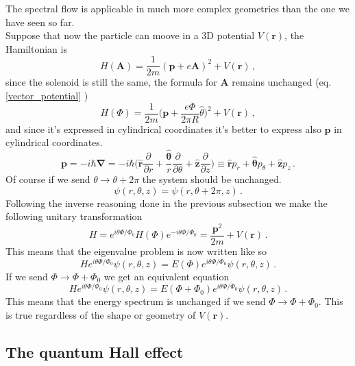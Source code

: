         The spectral flow is applicable in much more complex geometries than the one we have seen so far.\\
        Suppose that now the particle can moove in a 3D potential $V(\mathbf r)$, the Hamiltonian is
        \[
            H(\mathbf A)=\frac 1{2m}(\mathbf p + e\mathbf A)^2 + V(\mathbf r) \,,
        \]
        since the solenoid is still the same, the formula for $\mathbf A$ remains unchanged (eq. \ref{vector_potential} )
        \[
            H(\Phi)=\frac 1{2m}\bigg(\mathbf p + \frac{e\Phi}{2\pi R}\hat \theta\bigg)^2 + V(\mathbf r)\,,
        \]
        and since it's expressed in cylindrical coordinates it's better to express also $\mathbf p$ in cylindrical coordinates.
        \[
         \mathbf p =-i\hbar \mathbf \nabla=-i\hbar\bigg( 
             \mathbf{\hat r}\frac{\partial}{\partial r}+ \frac{\mathbf {\hat \theta}}{r}\frac{\partial}{\partial \theta} + \mathbf{\hat z}\frac{\partial}{\partial z}  \bigg) \equiv
             \mathbf{\hat r} p_r+ \mathbf {\hat \theta} p_\theta + \mathbf{\hat z} p_z\,.
        \]
        Of course if we send $\theta \to \theta + 2\pi$ the system should be unchanged.
        \[
            \psi(r,\theta,z)=\psi(r,\theta+2\pi,z)\,.
        \]
        Following the inverse reasoning done in the previous subsection we make the following unitary transformation
        \[
            H=e^{i\theta\Phi/\Phi_0}H(\Phi)e^{-i\theta\Phi/\Phi_0}=\frac  {\mathbf p^2} {2m} + V(\mathbf r)\,.
        \]
        This means that the eigenvalue problem is now written like so
        \[
            He^{i\theta\Phi/\Phi_0}\psi(r,\theta,z)=E(\Phi)e^{i\theta\Phi/\Phi_0}\psi(r,\theta,z)\,.
        \]
        If we send $\Phi \to \Phi+\Phi_0$ we get an equivalent equation
        \[
            He^{i\theta\Phi/\Phi_0}\psi(r,\theta,z)=E(\Phi+\Phi_0)e^{i\theta\Phi/\Phi_0}\psi(r,\theta,z)\,.
        \]
        This means that the energy spectrum is unchanged if we send $\Phi \to \Phi+\Phi_0$. This is true regardless of the shape or geometry of $V(\mathbf r)$.
        
    
    \subsection*{The quantum Hall effect}

    
    
